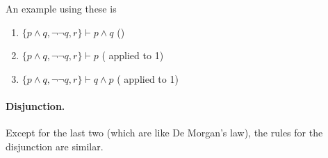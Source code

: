 \begin{prooftree}
\end{prooftree}

An example using these is
\begin{enumerate}
	\item $\{p\wedge q, \neg\neg q, r\}\vdash p\wedge q$ \hfill ()
	\item $\{p\wedge q, \neg\neg q, r\}\vdash p$ \hfill ( applied to 1)
	\item $\{p\wedge q, \neg\neg q, r\}\vdash q\wedge p$ \hfill ( applied to 1)
\end{enumerate}

\paragraph{Disjunction.}

Except for the last two (which are like De Morgan's law), the rules for the disjunction are similar.

\begin{prooftree}
\end{prooftree}

\begin{prooftree}
\end{prooftree}

\begin{prooftree}
\end{prooftree}

\begin{prooftree}
\end{prooftree}

\begin{prooftree}
\end{prooftree}

